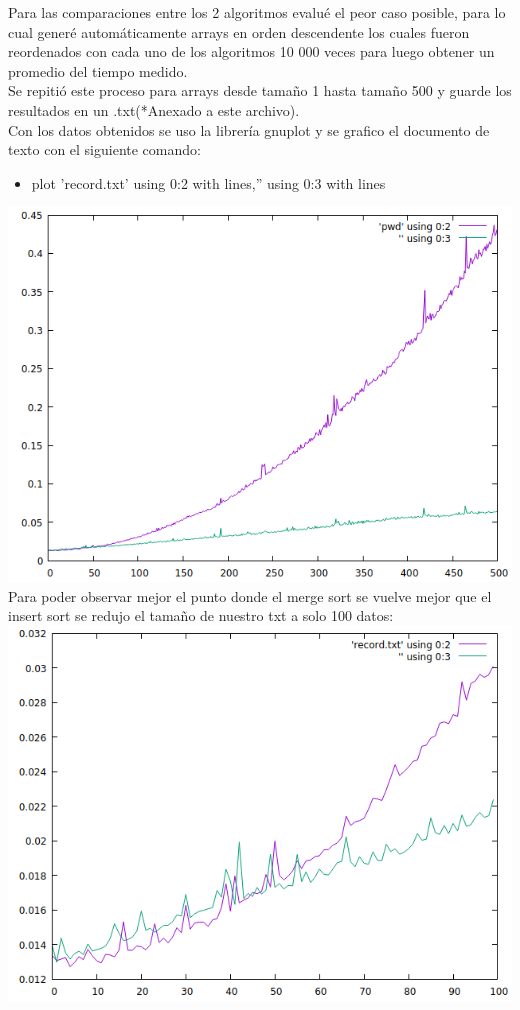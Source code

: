\documentclass{article}
\begin{document}
Para las comparaciones entre los 2 algoritmos evalué el peor caso posible, para lo cual generé automáticamente arrays en orden descendente los cuales fueron reordenados con cada uno de los algoritmos 10 000 veces para luego obtener un promedio del tiempo medido.\\
Se repitió este proceso para arrays desde tamaño 1 hasta tamaño 500 y guarde los resultados en un .txt(*Anexado a este archivo).\\
Con los datos obtenidos se uso la librería gnuplot y se grafico el documento de texto con el siguiente comando:
\begin{itemize}
    \item plot  'record.txt'  using 0:2 with lines,'' using 0:3 with lines
\end{itemize}
\includegraphics[width=\textwidth]{500datos.PNG}\\
Para poder observar mejor el punto donde el merge sort se vuelve mejor que el insert sort se redujo el tamaño de nuestro txt a solo 100 datos:\\
\includegraphics[width=\textwidth]{100datos.PNG}\\
\end{document}
